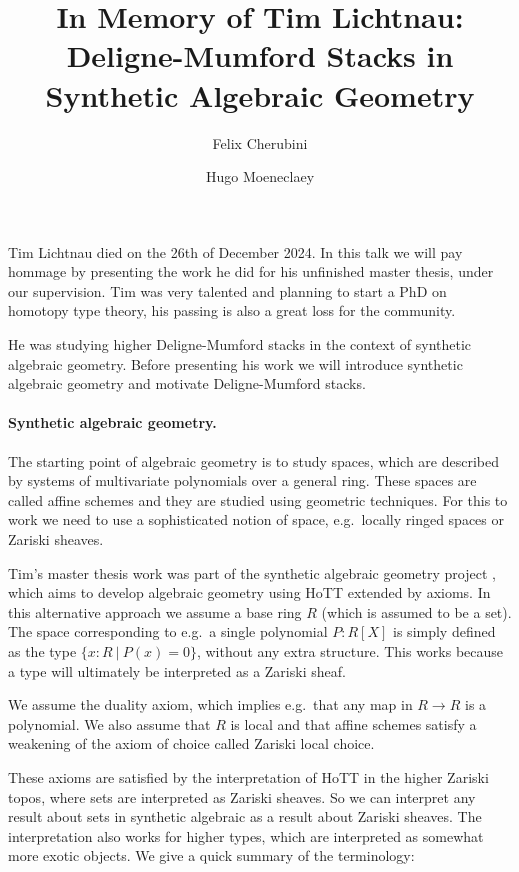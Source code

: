 \documentclass[letterpaper]{../../util/easychair}
\title{In Memory of Tim Lichtnau:\\
Deligne-Mumford Stacks in Synthetic Algebraic Geometry
}
\author{
Felix Cherubini\inst{1}
\and
 Hugo Moeneclaey\inst{2}
}
\institute{
  University of Augsburg
  \and
  University of Gothenburg and Chalmers University of Technology
}
\begin{document}
\maketitle

Tim Lichtnau died on the 26th of December 2024. In this talk we will pay hommage by presenting the work he did for his unfinished master thesis, under our supervision. Tim was very talented and planning to start a PhD on homotopy type theory, his passing is also a great loss for the community.

He was studying higher Deligne-Mumford stacks in the context of synthetic algebraic geometry. Before presenting his work we will introduce synthetic algebraic geometry and motivate Deligne-Mumford stacks.


\paragraph*{Synthetic algebraic geometry.}

The starting point of algebraic geometry is to study spaces, which are described by systems of multivariate polynomials over a general ring. These spaces are called affine schemes and they are studied using geometric techniques. For this to work we need to use a sophisticated notion of space, e.g.\ locally ringed spaces or Zariski sheaves.

Tim's master thesis work was part of the synthetic algebraic geometry project \cite{draft,sag-projective}, which aims to develop algebraic geometry using HoTT extended by axioms. In this alternative approach we assume a base ring $R$ (which is assumed to be a set). The space corresponding to e.g.\ a single polynomial $P:R[X]$ is simply defined as the type $\{x:R\ |\ P(x) = 0\}$, without any extra structure. This works because a type will ultimately be interpreted as a Zariski sheaf.

We assume the duality axiom, which implies e.g.\ that any map in $R\to R$ is a polynomial. We also assume that $R$ is local and that affine schemes satisfy a weakening of the axiom of choice called Zariski local choice.

These axioms are satisfied by the interpretation of HoTT in the higher Zariski topos, where sets are interpreted as Zariski sheaves. So we can interpret any result about sets in synthetic algebraic as a result about Zariski sheaves. The interpretation also works for higher types, which are interpreted as somewhat more exotic objects. We give a quick summary of the terminology:
\end{document}
